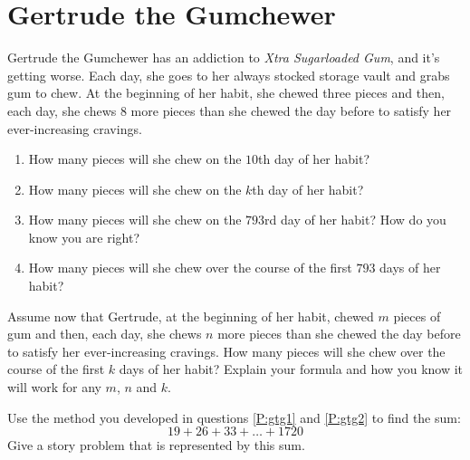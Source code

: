 \newpage
\section{Gertrude the Gumchewer}

\begin{prob}\label{P:gtg1}
Gertrude the Gumchewer has an addiction to \textit{Xtra Sugarloaded
  Gum}, and it's getting worse.  Each day, she goes to her always
stocked storage vault and grabs gum to chew.  At the beginning of her
habit, she chewed three pieces and then, each day, she chews 8 more
pieces than she chewed the day before to satisfy her ever-increasing
cravings.
\begin{enumerate}
\item How many pieces will she chew on the $10$th day of her habit?
\item How many pieces will she chew on the $k$th day of her habit?
\item How many pieces will she chew on the $793$rd day of her habit? How do you know you are right?
\item How many pieces will she chew over the course of the first $793$
  days of her habit?
\end{enumerate}
\end{prob}

\begin{prob}\label{P:gtg2}
Assume now that Gertrude, at the beginning of her habit, chewed $m$
pieces of gum and then, each day, she chews $n$ more pieces than she
chewed the day before to satisfy her ever-increasing cravings.  How many pieces will she chew over the course of the first $k$
  days of her habit? Explain your formula and how you know it will work for any $m$, $n$ and $k$.  
\end{prob}

\begin{prob}
Use the method you developed in questions \ref{P:gtg1} and
\ref{P:gtg2} to find the sum:
\[
19 + 26 + 33 + \dots + 1720
\]
Give a story problem that is represented by this sum.
\end{prob}

